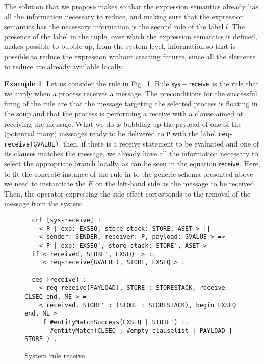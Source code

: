\documentclass{article}[12pt,a4paper]
\theoremstyle{definition}
\newtheorem{example}{Example}[section]
\begin{document}
The solution that we propose makes so that the expression semantics already has
all the information necessary to reduce, and making sure that the expression
semantics has the necessary information is the second role of the label $l$.
The presence of the label in the tuple, over which the expression semantics is
defined, makes possible to bubble up, from the system level, information so that is
possible to reduce the expression without creating futures, since all the
elements to reduce are already available locally. 

\begin{example}\label{ex:rec}
  Let us consider the rule in Fig.~\ref{fig:rule-rec}. Rule $\mathsf{sys-receive}$
  is the rule that we apply when a process receives a message. The preconditions
  for the successful firing of the rule are that the message targeting the
  selected process is floating in the soup and that the process is performing a
  receive with a clause aimed at receiving the message. What we do is bubbling
  up the payload of one of the (potential many) messages ready to be delivered
  to \verb_P_ with the label \verb_req-receive(GVALUE)_, then, if there is a
  receive statement to be evaluated and one of its clauses matches the message,
  we already have all the information necessary to select the appropriate branch
  locally, as can be seen in the equation $\mathsf{receive}$. Here, to fit the
  concrete instance of the rule in to the generic schema presented above we need
  to instantiate the $E$ on the left-hand side as the message to be received.
  Then, the operator expressing the side effect corresponds to the removal of
  the message from the system.
\end{example}


\begin{figure}[t]
  \centering
\begin{verbatim}
  crl [sys-receive] :
    < P | exp: EXSEQ, store-stack: STORE, ASET > ||
    < sender: SENDER, receiver: P, payload: GVALUE > =>
    < P | exp: EXSEQ', store-stack: STORE', ASET >
  if < received, STORE', EXSEQ' > :=
     < req-receive(GVALUE), STORE, EXSEQ > .

  ceq [receive] :
    < req-receive(PAYLOAD), STORE : STORESTACK, receive CLSEQ end, ME > =
    < received, STORE' : (STORE : STORESTACK), begin EXSEQ end, ME >
    if #entityMatchSuccess(EXSEQ | STORE') := 
       #entityMatch(CLSEQ ; #empty-clauselist | PAYLOAD | STORE ) .

\end{verbatim}
  \caption{System rule receive}
  \label{fig:rule-rec}
\end{figure}
\end{document}
